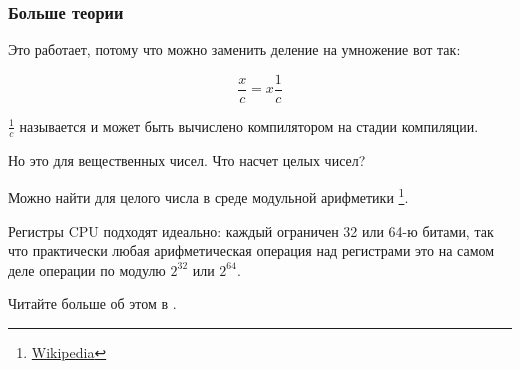 

\subsubsection{Больше теории}

Это работает, потому что можно заменить деление на умножение вот так:

\[
	\frac{x}{c} = x\frac{1}{c}
\]


$\frac{1}{c}$ называется  и может быть вычислено компилятором на стадии компиляции.

Но это для вещественных чисел.
Что насчет целых чисел?

Можно найти  для целого числа в среде модульной арифметики
\footnote{\href{http://go.yurichev.com/17359}{Wikipedia}}.

Регистры \ac{CPU} подходят идеально: каждый ограничен 32 или 64-ю битами, так что практически любая арифметическая операция над регистрами это на самом деле операции по модулю $2^{32}$ или $2^{64}$.

Читайте больше об этом в .
